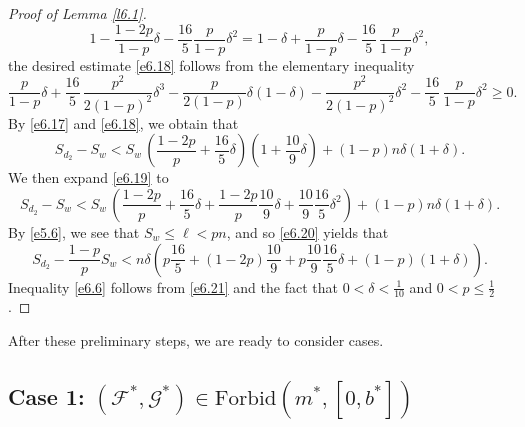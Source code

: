 \documentclass[10pt]{amsart}
\theoremstyle{remark}
\newcommand{\meg}{\geqslant}
\newcommand{\mik}{\leqslant}
\newcommand{\Fcal}{\mathcal{F}}
\newcommand{\Gcal}{\mathcal{G}}
\begin{document}
\begin{proof}[Proof of Lemma \emph{\ref{l6.1}}]
\begin{equation}
1-\frac{1-2p}{1-p}\delta-\frac{16}{5}\frac{p}{1-p}\delta^2 =
1-\delta+ \frac{p}{1-p}\delta -\frac{16}{5}\, \frac{p}{1-p}\delta^2,
\end{equation}
the desired estimate \eqref{e6.18} follows from the elementary inequality
\begin{equation} \label{en.6.3}
\frac{p}{1-p}\delta + \frac{16}{5}\, \frac{p^2}{2(1-p)^2}\delta^3
- \frac{p}{2(1-p)}\delta(1-\delta) - \frac{p^2}{2(1-p)^2}\delta^2
- \frac{16}{5}\, \frac{p}{1-p}\delta^2 \meg 0.
\end{equation}
By \eqref{e6.17} and \eqref{e6.18}, we obtain that
\begin{equation} \label{e6.19}
S_{d_2}-S_w < S_w\, \left(\frac{1-2p}{p}+\frac{16}{5}\delta\right)
\left(1+\frac{10}{9}\delta\right)+(1-p)n\delta\left(1+\delta\right).
\end{equation}
We then expand \eqref{e6.19} to
\begin{equation} \label{e6.20}
S_{d_2}-S_w < S_w\, \left(\frac{1-2p}{p}+ \frac{16}{5}\delta+ \frac{1-2p}{p}\frac{10}{9}\delta +\frac{10}{9}\frac{16}{5}\delta^2\right)+(1-p)n\delta\left(1+\delta\right).
\end{equation}
By \eqref{e5.6}, we see that $S_w\mik \ell< pn$, and so \eqref{e6.20} yields that
\begin{equation} \label{e6.21}
S_{d_2}-\frac{1-p}{p}S_w < n\delta \left(p\frac{16}{5}+(1-2p)\frac{10}{9}+p\frac{10}{9}\frac{16}{5}\delta+(1-p)\left(1+\delta\right)\right).
\end{equation}
Inequality \eqref{e6.6} follows from \eqref{e6.21} and the fact that
$0<\delta<\frac{1}{10}$ and $0<p\mik\frac{1}{2}$.
\end{proof}
After these preliminary steps, we are ready to consider cases.

\subsection*{Case 1: $(\Fcal^*,\Gcal^*)\in\mathrm{Forbid}(m^*,[0,b^*])$}
\end{document}
